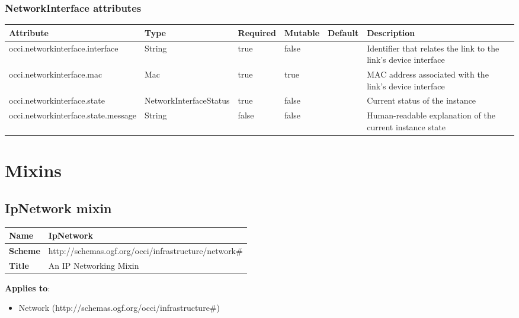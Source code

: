 \documentclass{article}
\begin{document}
\subsubsection{NetworkInterface attributes}
\begin{tabularx}{\textwidth}{|l|l|p{1.4cm}|p{1.3cm}|l|X|}
  \hline
  \textbf{Attribute} & \textbf{Type} & \textbf{Required} & \textbf{Mutable} & \textbf{Default} & \textbf{Description} \\
  \hline  
  occi.networkinterface.interface & String & true & false &  & Identifier that relates the link to the link's device interface \\
  \hline
  occi.networkinterface.mac & Mac & true & true &  & MAC address associated with the link's device interface \\
  \hline
  occi.networkinterface.state & NetworkInterfaceStatus & true & false &  & Current status of the instance \\
  \hline
  occi.networkinterface.state.message & String & false & false &  & Human-readable explanation of the current instance state \\
  \hline
\end{tabularx}


\section{Mixins}
\subsection{IpNetwork mixin}
\begin{center}
\begin{tabular}{|l|l|}
  \hline
  \textbf{Name} & IpNetwork \\
  \hline  
  \textbf{Scheme} & http://schemas.ogf.org/occi/infrastructure/network\# \\
  \hline
  \textbf{Title} & An IP Networking Mixin \\
  \hline
\end{tabular}
\end{center}
\textbf{Applies to}:
\begin{itemize}
	\item Network (http://schemas.ogf.org/occi/infrastructure\#)
\end{itemize}
\end{document}
